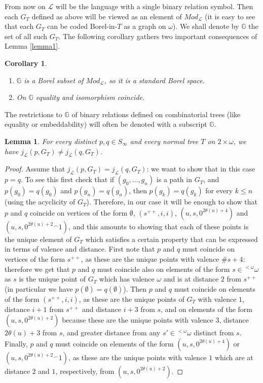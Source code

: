 \documentclass{amsart}
\newtheorem{lemma}[theorem]{Lemma}
\newtheorem{corollary}[theorem]{Corollary}
\theoremstyle{definition}
\theoremstyle{remark}
\begin{document}
From now on $ {\mathcal{L}} $ will be the language with a single binary relation
symbol. Then each $G_T$ defined as above will be viewed as an element
of $Mod_{\mathcal{L}}$ (it is easy to see that each $G_T$ can be coded
Borel-in-$T$ as a graph on $\omega$). We shall denote by ${\mathbb{G}}$ the set
of all such $G_T$. The following corollary gathers two important
consequences of Lemma \ref{lemma1}.
\begin{corollary}\label{mathbbg}
\begin{enumerate}[1)]
\item ${\mathbb{G}} $ is a Borel subset of $Mod_{\mathcal{L}}$, so it is a standard Borel space.
\item On ${\mathbb{G}}$ equality and isomorphism coincide.
\end{enumerate}
\end{corollary}

The restrictions to $ {\mathbb{G}} $ of binary relations defined on combinatorial trees (like equality or embeddability) will often be denoted with a subscript $ {\mathbb{G}} $.

\begin{lemma}\label{lemma2}
 For every distinct $p,q \in S_\infty$ and every  normal
 tree $T$ on $2 \times
 \omega$, we have $j_{\mathcal{L}}(p,G_T) \neq j_{\mathcal{L}}(q,G_T)$.
\end{lemma}

\begin{proof}
 Assume that $j_{\mathcal{L}}(p,G_T) =
j_{\mathcal{L}}(q,G_T)$: we want to show that in this case $p=q$. To see this first
check that if $(g_0, \dotsc ,g_n)$ is a path in $G_T$,
and $p(g_0) = q(g_0)$ and $p(g_n) = q(g_n)$,
then $p(g_k) = q(g_k)$ for every $k \leq n$ (using the acyclicity of
$G_T$). Therefore, in our case it will be enough to show that
$p$ and $q$ coincide on vertices of the form $\emptyset$,
$(s^{++},i,i)$, $(u,s,0^{2 \theta(u)+4})$  and $(u,s,0^{2 \theta(u)+2}
{}^\smallfrown 1)$, and this amounts to showing that each of these points is
the unique element of $G_T$ which satisfies a certain  property that
can be expressed in terms of valence and distance. First note that $p$
and $q$ must coincide on vertices of the form $s^{++}$, as these are
the unique points with valence $\# s+4$: therefore we get that $p$ and
$q$ must coincide also on elements of the form $s \in {{}^{<\omega}\omega}$ as $s$ is
the unique point of $G_T$ which has valence $\omega$ and is at
distance $2$ from $s^{++}$ (in particular we have $p(\emptyset) =
q(\emptyset)$). Then $p$ and $q$ must coincide on elements of the form
$(s^{++},i,i)$, as these are the unique points of $G_T$ with
valence $1$, distance $i+1$ from $s^{++}$ and distance $i+3$ from $s$,
and on elements of the form $(u,s,0^{2 \theta(u)+2})$ because these
are the unique points with valence $3$, distance $2\theta(u)+3$ from
$s$, and greater distance from any $s' \in {{}^{<\omega}\omega}$ distinct from
$s$. Finally, $p$ and $q$ must coincide on elements of the form
$(u,s,0^{2 \theta(u)+4})$ or $(u,s,0^{2 \theta(u)+2} {}^\smallfrown
1)$, as these are the unique points with valence $1$ which are at
distance $2$ and $1$, respectively, from $(u,s,0^{2 \theta(u)+2})$.
\end{proof}
\end{document}

